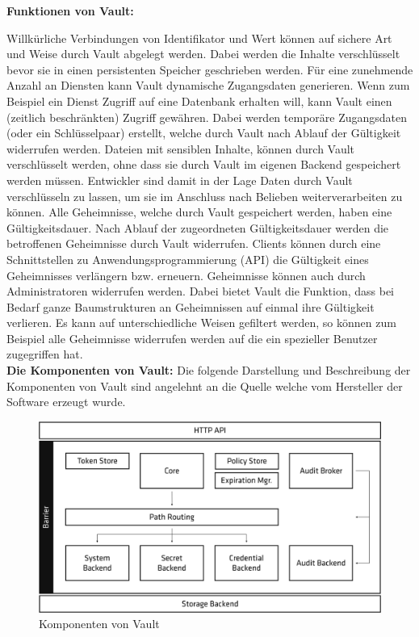 \documentclass[
book,
a4paper,   
titlepage,  
halfparskip,
12pt        
]{scrartcl}
\begin{document}
\begin{onehalfspacing}
\textbf{Funktionen von Vault:}

Willkürliche Verbindungen von Identifikator und Wert können auf sichere Art und Weise durch Vault abgelegt werden. Dabei werden die Inhalte verschlüsselt bevor sie in einen persistenten Speicher geschrieben werden.
Für eine zunehmende Anzahl an Diensten kann Vault dynamische Zugangsdaten generieren. Wenn zum Beispiel ein Dienst Zugriff auf eine Datenbank erhalten will, kann Vault einen (zeitlich beschränkten) Zugriff gewähren. Dabei werden temporäre Zugangsdaten (oder ein Schlüsselpaar) erstellt, welche durch Vault nach Ablauf der Gültigkeit widerrufen werden.
Dateien mit sensiblen Inhalte, können durch Vault verschlüsselt werden, ohne dass sie durch Vault im eigenen Backend gespeichert werden müssen. Entwickler sind damit in der Lage Daten durch Vault verschlüsseln zu lassen, um sie im Anschluss nach Belieben weiterverarbeiten zu können.\cite{vaultintro}\newline
Alle Geheimnisse, welche durch Vault gespeichert werden, haben eine Gültigkeitsdauer. Nach Ablauf der zugeordneten Gültigkeitsdauer werden die betroffenen Geheimnisse durch Vault widerrufen. Clients können durch eine Schnittstellen zu Anwendungsprogrammierung (API) die Gültigkeit eines Geheimnisses verlängern bzw. erneuern.
Geheimnisse können auch durch Administratoren widerrufen werden. Dabei bietet Vault die Funktion, dass bei Bedarf ganze Baumstrukturen an Geheimnissen auf einmal ihre Gültigkeit verlieren. Es kann auf unterschiedliche Weisen gefiltert werden, so können zum Beispiel alle Geheimnisse widerrufen werden auf die ein spezieller Benutzer zugegriffen hat.\cite{vaultintro}\\

\textbf{Die Komponenten von Vault:}
Die folgende Darstellung und Beschreibung der Komponenten von Vault sind angelehnt an die Quelle \cite{vault} welche vom Hersteller der Software erzeugt wurde. 

\begin{figure}[h]
	\centering
	\includegraphics[width=1\linewidth]{vault.png}
	\caption[Vault]{Komponenten von Vault\cite{vault}}
	\label{fig:vault}
\end{figure}


\end{onehalfspacing}
\end{document}
